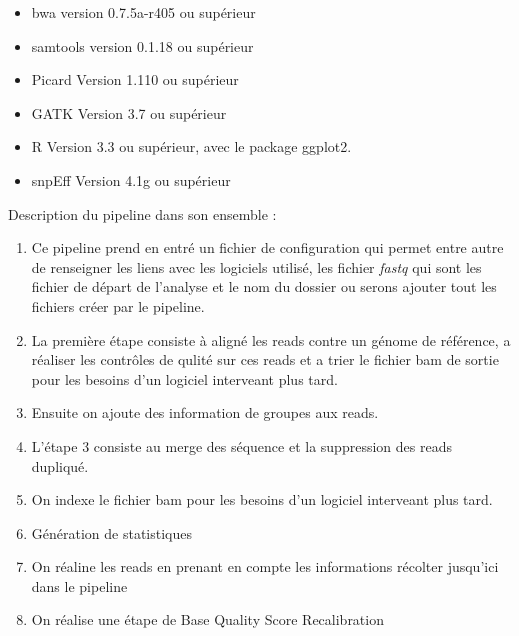 \documentclass[12pt]{article}
\begin{document}
\begin{itemize}
\item bwa version 0.7.5a-r405 ou supérieur
\item samtools version 0.1.18 ou supérieur
\item Picard Version 1.110 ou supérieur
\item GATK Version 3.7 ou supérieur
\item R Version 3.3 ou supérieur, avec le package ggplot2.
\item snpEff Version 4.1g ou supérieur
\end{itemize}

Description du pipeline dans son ensemble :
\begin{enumerate}
\item Ce pipeline prend en entré un fichier de configuration qui permet entre autre de renseigner les liens avec les logiciels utilisé, les fichier \textit{fastq} qui sont les fichier de départ de l'analyse et le nom du dossier ou serons ajouter tout les fichiers créer par le pipeline. 
\item La première étape consiste à aligné les reads contre un génome de référence, a réaliser les contrôles de qulité sur ces reads et a trier le fichier bam de sortie pour les besoins d'un logiciel interveant plus tard. 
\item Ensuite on ajoute des information de groupes aux reads.
\item L'étape 3 consiste au merge des séquence et la suppression des reads dupliqué. 
\item On indexe le fichier bam pour les besoins d'un logiciel interveant plus tard. 
\item Génération de statistiques
\item On réaline les reads en prenant en compte les informations récolter jusqu'ici dans le pipeline
\item On réalise une étape de Base Quality Score Recalibration 
\end{enumerate}
\end{document}
